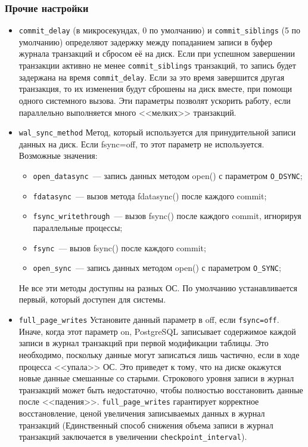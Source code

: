 \subsubsection{Прочие настройки}


\begin{itemize}
  \item \lstinline!commit_delay! (в микросекундах, 0 по умолчанию) и \lstinline!commit_siblings! (5 по умолчанию) определяют задержку между попаданием записи в буфер журнала транзакций и сбросом её на диск. Если при успешном завершении транзакции активно не менее \lstinline!commit_siblings! транзакций, то запись будет задержана на время \lstinline!commit_delay!. Если за это время завершится другая транзакция, то их изменения будут сброшены на диск вместе, при помощи одного системного вызова. Эти параметры позволят ускорить работу, если параллельно выполняется много <<мелких>> транзакций.

  \item \lstinline!wal_sync_method! Метод, который используется для принудительной записи данных на диск. Если fsync=off, то этот параметр не используется. Возможные значения:
  \begin{itemize}
    \item \lstinline!open_datasync!~--- запись данных методом open() с параметром \lstinline!O_DSYNC!;
    \item \lstinline!fdatasync!~--- вызов метода fdatasync() после каждого commit;
    \item \lstinline!fsync_writethrough!~--- вызов fsync() после каждого commit, игнорируя параллельные процессы;
    \item \lstinline!fsync!~--- вызов fsync() после каждого commit;
    \item \lstinline!open_sync!~--- запись данных методом open() с параметром \lstinline!O_SYNC!;
  \end{itemize}

  Не все эти методы доступны на разных ОС. По умолчанию устанавливается первый, который доступен для системы.

  \item \lstinline!full_page_writes! Установите данный параметр в off, если \lstinline!fsync=off!. Иначе, когда этот параметр on, PostgreSQL записывает содержимое каждой записи в журнал транзакций при первой модификации таблицы. Это необходимо, поскольку данные могут записаться лишь частично, если в ходе процесса <<упала>> ОС. Это приведет к тому, что на диске окажутся новые данные смешанные со старыми. Строкового уровня записи в журнал транзакций может быть недостаточно, чтобы полностью восстановить данные после <<падения>>. \lstinline!full_page_writes! гарантирует корректное восстановление, ценой увеличения записываемых данных в журнал транзакций (Единственный способ снижения объема записи в журнал транзакций заключается в увеличении \lstinline!checkpoint_interval!).


\end{itemize}

